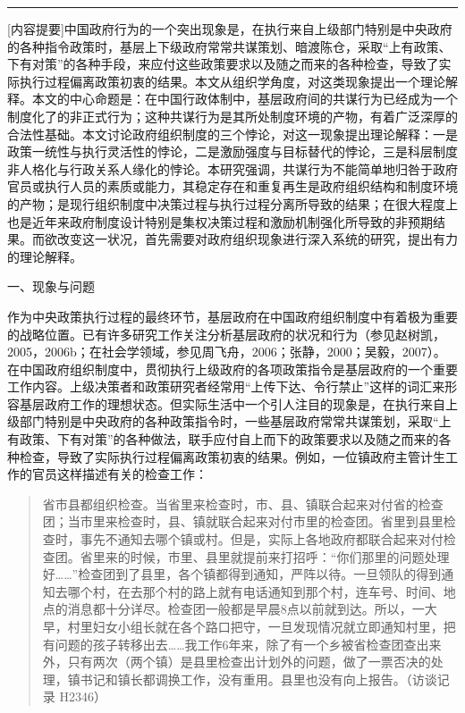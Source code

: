 \documentclass[12pt,a4paper]{article}
\begin{document}
\noindent\rule{\textwidth}{0.4pt}

\vspace{0.3em}



[内容提要]中国政府行为的一个突出现象是，在执行来自上级部门特别是中央政府的各种指令政策时，基层上下级政府常常共谋策划、暗渡陈仓，采取“上有政策、下有对策”的各种手段，来应付这些政策要求以及随之而来的各种检查，导致了实际执行过程偏离政策初衷的结果。本文从组织学角度，对这类现象提出一个理论解释。本文的中心命题是：在中国行政体制中，基层政府间的共谋行为已经成为一个制度化了的非正式行为；这种共谋行为是其所处制度环境的产物，有着广泛深厚的合法性基础。本文讨论政府组织制度的三个悖论，对这一现象提出理论解释：一是政策一统性与执行灵活性的悖论，二是激励强度与目标替代的悖论，三是科层制度非人格化与行政关系人缘化的悖论。本研究强调，共谋行为不能简单地归咎于政府官员或执行人员的素质或能力，其稳定存在和重复再生是政府组织结构和制度环境的产物；是现行组织制度中决策过程与执行过程分离所导致的结果；在很大程度上也是近年来政府制度设计特别是集权决策过程和激励机制强化所导致的非预期结果。而欲改变这一状况，首先需要对政府组织现象进行深入系统的研究，提出有力的理论解释。



一、现象与问题



作为中央政策执行过程的最终环节，基层政府在中国政府组织制度中有着极为重要的战略位置。已有许多研究工作关注分析基层政府的状况和行为（参见赵树凯，2005，2006b；在社会学领域，参见周飞舟，2006；张静，2000；吴毅，2007）。在中国政府组织制度中，贯彻执行上级政府的各项政策指令是基层政府的一个重要工作内容。上级决策者和政策研究者经常用“上传下达、令行禁止”这样的词汇来形容基层政府工作的理想状态。但实际生活中一个引人注目的现象是，在执行来自上级部门特别是中央政府的各种政策指令时，一些基层政府常常共谋策划，采取“上有政策、下有对策”的各种做法，联手应付自上而下的政策要求以及随之而来的各种检查，导致了实际执行过程偏离政策初衷的结果。例如，一位镇政府主管计生工作的官员这样描述有关的检查工作：



\begin{quotation}\kaifont\noindent 省市县都组织检查。当省里来检查时，市、县、镇联合起来对付省的检查团；当市里来检查时，县、镇就联合起来对付市里的检查团。省里到县里检查时，事先不通知去哪个镇或村。但是，实际上各地政府都联合起来对付检查团。省里来的时候，市里、县里就提前来打招呼：“你们那里的问题处理好……”检查团到了县里，各个镇都得到通知，严阵以待。一旦领队的得到通知去哪个村，在去那个村的路上就有电话通知到那个村，连车号、时间、地点的消息都十分详尽。检查团一般都是早晨8点以前就到达。所以，一大早，村里妇女小组长就在各个路口把守，一旦发现情况就立即通知村里，把有问题的孩子转移出去……我工作6年来，除了有一个乡被省检查团查出来外，只有两次（两个镇）是县里检查出计划外的问题，做了一票否决的处理，镇书记和镇长都调换工作，没有重用。县里也没有向上报告。（访谈记录 H2346）\end{quotation}
\end{document}

